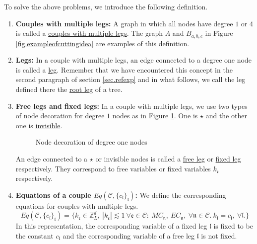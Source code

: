 To solve the above problems, we introduce the following definition.

\begin{defn}\label{def.couplemultileg}
\begin{enumerate}
 \item \textbf{Couples with multiple legs:} A graph in which all nodes have degree $1$ or $4$ is called a \underline{couples with multiple legs}. The graph $A$ and $B_{a,b,c}$ in Figure \ref{fig.exampleofcuttingidea} are examples of this definition.
 \item \textbf{Legs:} In a couple with multiple legs, an edge connected to a degree one node is called a \underline{leg}. Remember that we have encountered this concept in the second paragraph of section \ref{sec.refexp} and in what follows, we call the leg defined there the \underline{root leg} of a tree. 
 \item \textbf{Free legs and fixed legs:} In a couple with multiple legs, we use two types of node decoration for degree $1$ nodes as in Figure \ref{fig.decorationdegreeone}. One is $\star$ and the other one is \underline{invisible}. 
 \begin{figure}[H]
 \centering
 \caption{Node decoration of degree one nodes}
 \label{fig.decorationdegreeone}
 \end{figure}
 An edge connected to a $\star$ or invisible nodes is called a \underline{free leg} or \underline{fixed leg} respectively. They correspond to free variables or fixed variables $k_{\mathfrak{e}}$ respectively.
 
 
 \item \textbf{Equations of a couple $Eq(\mathcal{C},\{c_{\mathfrak{l}}\}_{\mathfrak{l}})$:} We define the corresponding equations for couples with multiple legs.
 \begin{equation}\label{eq.Eq(C,c)}
 Eq(\mathcal{C},\{c_{\mathfrak{l}}\}_{\mathfrak{l}})=\{k_{\mathfrak{e}}\in \mathbb{Z}^d_L,\ |k_{\mathfrak{e}}|\lesssim 1\ \forall \mathfrak{e}\in \mathcal{C}:\ MC_{\mathfrak{n}},\  EC_{\mathfrak{n}},\ \forall \mathfrak{n}\in \mathcal{C}.\ k_{\mathfrak{l}}=c_{\mathfrak{l}},\ \forall \mathfrak{l}.\} 
 \end{equation}
 In this representation, the corresponding variable of a fixed leg $\mathfrak{l}$ is fixed to be the constant $c_{\mathfrak{l}}$ and the corresponding variable of a free leg $\mathfrak{l}$ is not fixed.
\end{enumerate}
\end{defn}

